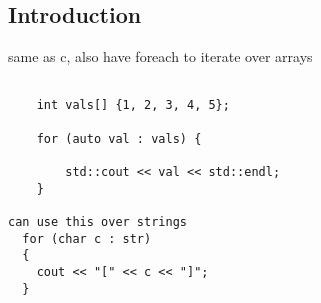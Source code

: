 
\subsection{Introduction}

same as c, also have foreach to iterate over arrays

\begin{verbatim}

    int vals[] {1, 2, 3, 4, 5};

    for (auto val : vals) {

        std::cout << val << std::endl;
    }

can use this over strings
  for (char c : str)
  {
    cout << "[" << c << "]";
  }
\end{verbatim}
